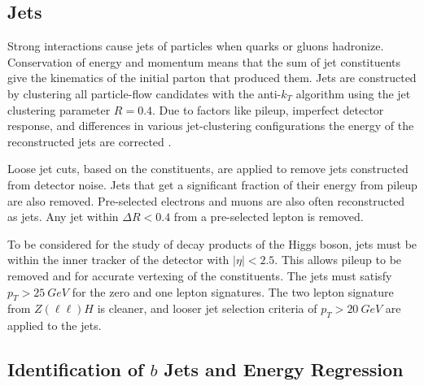 
\subsection{Jets} \label{sec:jets-def}

Strong interactions cause jets of particles when quarks or gluons hadronize.
Conservation of energy and momentum means that the sum of jet constituents
give the kinematics of the initial parton that produced them.
Jets are constructed by clustering all particle-flow candidates
with the anti-$k_T$ algorithm \cite{Cacciari_2008}
using the jet clustering parameter $R = 0.4$.
Due to factors like pileup, imperfect detector response, and differences in various jet-clustering
configurations the energy of the reconstructed jets are corrected \cite{Khachatryan_2017}.

Loose jet cuts, based on the constituents,
are applied to remove jets constructed from detector noise.
Jets that get a significant fraction of their energy from pileup are also removed.
Pre-selected electrons and muons are also often reconstructed as jets.
Any jet within $\Delta R < 0.4$ from a pre-selected lepton is removed.

To be considered for the study of decay products of the Higgs boson,
jets must be within the inner tracker of the detector with $|\eta| < 2.5$.
This allows pileup to be removed and for accurate vertexing of the constituents.
The jets must satisfy $p_T > \SI{25}{GeV}$ for the zero and one lepton signatures.
The two lepton signature from $Z(\ell\ell)H$ is cleaner,
and looser jet selection criteria of $p_T > \SI{20}{GeV}$ are applied to the jets.

\subsection{Identification of $b$ Jets and Energy Regression}

